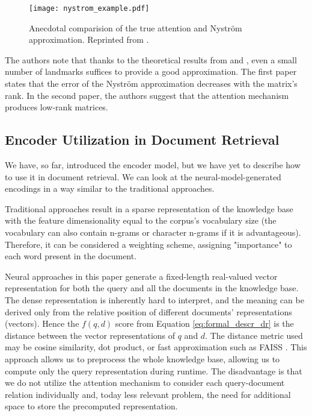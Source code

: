 \begin{figure}[!htb]
        \centering
        \texttt{[image: nystrom\_example.pdf]}
        \caption[\nystr{} Attention Example]{Anecdotal comparision of the true attention and Nystr\"om approximation. Reprinted from \citep{nystrom}.}
        \label{fig:nystrom_example}
\end{figure}

The authors note that thanks to the theoretical results from \citep{nystr-2017} and \citep{linformer}, even a small number of landmarks suffices to provide a good approximation.
The first paper states that the error of the Nystr\"om approximation decreases with the matrix's rank.
In the second paper, the authors suggest that the attention mechanism produces low-rank matrices.  

\subsection{Encoder Utilization in Document Retrieval}

We have, so far, introduced the encoder model, but we have yet to describe how to use it in document retrieval. We can look at the neural-model-generated encodings in a way similar to the traditional approaches.

Traditional approaches result in a sparse representation of the knowledge base with the feature dimensionality equal to the corpus's vocabulary size (the vocabulary can also contain n-grams or character n-grams if it is advantageous).
Therefore, it can be considered a weighting scheme, assigning "importance" to each word present in the document. 

Neural approaches in this paper generate a fixed-length real-valued vector representation for both the query and all the documents in the knowledge base.
The dense representation is inherently hard to interpret, and the meaning can be derived only from the relative position of different documents' representations (vectors).
Hence the $f(q,d)$ score from Equation \ref{eq:formal_descr_dr} is the distance between the vector representations of $q$ and $d$.
The distance metric used may be cosine similarity, dot product, or fast approximation such as FAISS \citep{faiss}.
This approach allows us to preprocess the whole knowledge base, allowing us to compute only the query representation during runtime.
The disadvantage is that we do not utilize the attention mechanism to consider each query-document relation individually and, today less relevant problem, the need for additional space to store the precomputed representation.

